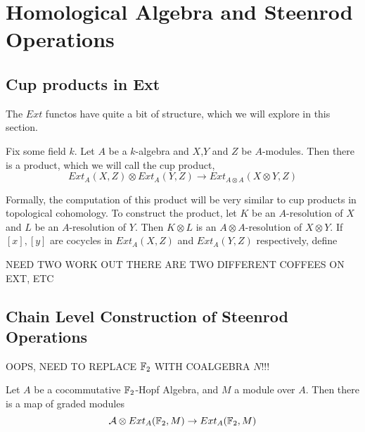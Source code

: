 

\section{Homological Algebra and Steenrod Operations}

\subsection{Cup products in Ext}
\label{sec:ExtStructure}

The $Ext$ functos have quite a bit of structure, which we will explore in this section.  

Fix some field $k$. 
Let $A$ be a $k$-algebra and $X$,$Y$ and $Z$ be $A$-modules.
Then there is a product, which we will call the cup product, 
\[Ext_A(X,Z)\otimes Ext_A(Y,Z)\to Ext_{A\otimes A}(X\otimes Y,Z)\]

Formally, the computation of this product will be very similar to cup products in topological cohomology.  
To construct the product, let $K$ be an  $A$-resolution of $X$ and $L$ be an  $A$-resolution of $Y$.  
Then $K\otimes L$ is an $A\otimes A$-resolution of $X\otimes Y$.  
If $[x],[y]$ are cocycles in $Ext_A(X,Z)$ and $Ext_A(Y,Z)$ respectively, define

NEED TWO WORK OUT THERE ARE TWO DIFFERENT COFFEES ON EXT, ETC

\subsection{Chain Level Construction of Steenrod Operations}
\label{sec:SteenrodConstruction}


OOPS, NEED TO REPLACE $\mathbb{F}_2$ WITH COALGEBRA $N$!!!


\begin{Theorem}
  Let $A$ be a cocommutative $\mathbb{F}_2$-Hopf Algebra, and $M$ a module over $A$.  
  Then there is a map of graded modules
  \[\mathcal{A}\otimes Ext_A(\mathbb{F}_2,M)\to Ext_A(\mathbb{F}_2,M)\]
\end{Theorem}

